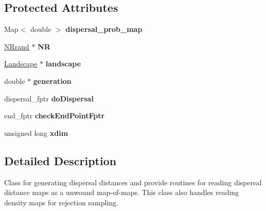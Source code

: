 \subsection*{Protected Attributes}
\begin{DoxyCompactItemize}
\item 
Map$<$ double $>$ {\bfseries dispersal\+\_\+prob\+\_\+map}\hypertarget{class_dispersal_coordinator_ac840e1b9b3da20c131137c2801754d87}{}\label{class_dispersal_coordinator_ac840e1b9b3da20c131137c2801754d87}

\item 
\hyperlink{class_n_rrand}{N\+Rrand} $\ast$ {\bfseries NR}\hypertarget{class_dispersal_coordinator_ac4c17447257ed00e1b5610e0e35a5443}{}\label{class_dispersal_coordinator_ac4c17447257ed00e1b5610e0e35a5443}

\item 
\hyperlink{class_landscape}{Landscape} $\ast$ {\bfseries landscape}\hypertarget{class_dispersal_coordinator_a316f067e84937650316f47b219e2cb76}{}\label{class_dispersal_coordinator_a316f067e84937650316f47b219e2cb76}

\item 
double $\ast$ {\bfseries generation}\hypertarget{class_dispersal_coordinator_ae3f83d100dad7c60137edf42b3c199c1}{}\label{class_dispersal_coordinator_ae3f83d100dad7c60137edf42b3c199c1}

\item 
dispersal\+\_\+fptr {\bfseries do\+Dispersal}\hypertarget{class_dispersal_coordinator_a93262d2bb612108bfcdc56c1ba11bad1}{}\label{class_dispersal_coordinator_a93262d2bb612108bfcdc56c1ba11bad1}

\item 
end\+\_\+fptr {\bfseries check\+End\+Point\+Fptr}\hypertarget{class_dispersal_coordinator_a1612005c176cd769797a4d4e459e2dec}{}\label{class_dispersal_coordinator_a1612005c176cd769797a4d4e459e2dec}

\item 
unsigned long {\bfseries xdim}\hypertarget{class_dispersal_coordinator_a66668e6ceec55afa61c1e99719bc6146}{}\label{class_dispersal_coordinator_a66668e6ceec55afa61c1e99719bc6146}

\end{DoxyCompactItemize}


\subsection{Detailed Description}
Class for generating dispersal distances and provide routines for reading dispersal distance maps as a unwound map-\/of-\/maps. This class also handles reading density maps for rejection sampling. 

